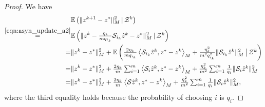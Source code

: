\begin{proof}
We have
\begin{equation}\label{eqn:equality_inconsistent}
\begin{aligned}
&\mathbb{E}\left(\|z^{k+1} - z^*\|_M^2\,|\,\cZ^k\right)\\
\overset{\eqref{eqn:asyn_update_a2}}=&\mathbb{E}\left(\|z^{k}  -
\textstyle\frac{\eta_k}{mq_{i_k}}\cS_{i_k} \hat{z}^{k}- z^*
\|_M^2\,|\,\cZ^k\right)\\
=& \|z^k -
z^*\|_M^2+\mathbb{E}\left(\textstyle\frac{2\eta_k}{mq_{i_k}} \left\langle
\cS_{i_k} \hat{z}^{k}, z^* - z^k \right\rangle_M +
\textstyle\frac{\eta_k^2}{m^2q_{i_k}^2}
\|\cS_{i_k}\hat{z}^{k}\|_M^2\,\big|\,\cZ^k\right)\\
=&\|z^k -
z^*\|_M^2+\textstyle\frac{2\eta_k}{m} \sum_{i=1}^m\left\langle \cS_i
\hat{z}^{k}, z^* - z^k \right\rangle_M +
\frac{\eta_k^2}{m^2}\sum_{i=1}^m\frac{1}{q_i}\|\cS_i\hat{z}^{k}\|_M^2\\
=&\|z^k
- z^*\|_M^2+\textstyle\frac{2\eta_k}{m} \left\langle \cS \hat{z}^{k}, z^* - z^k
\right\rangle_M +\frac{\eta_k^2}{m^2} \sum_{i=1}^m\frac{1}{q_i}
\|\cS_i\hat{z}^{k}\|_M^2,
\end{aligned}
\end{equation}
where the third equality holds because the probability of choosing $i$ is $q_i$.


\end{proof}
